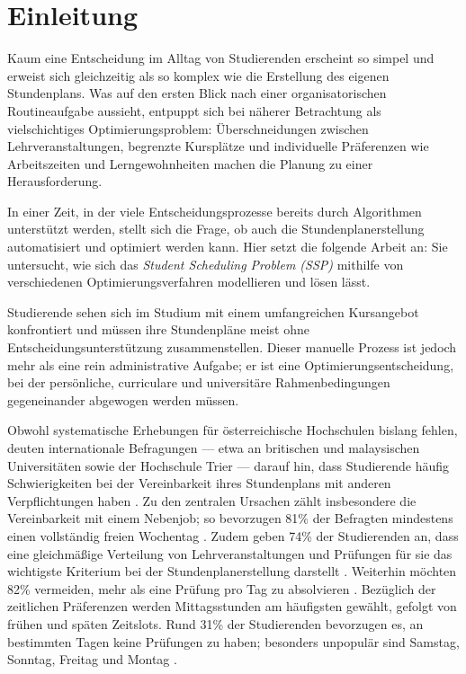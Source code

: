 \section{Einleitung}


Kaum eine Entscheidung im Alltag von Studierenden erscheint so simpel und erweist sich gleichzeitig als so komplex wie die Erstellung des eigenen Stundenplans. Was auf den ersten Blick nach einer organisatorischen Routineaufgabe aussieht, entpuppt sich bei näherer Betrachtung als vielschichtiges Optimierungsproblem: Überschneidungen zwischen Lehrveranstaltungen, begrenzte Kursplätze und individuelle Präferenzen wie Arbeitszeiten und Lerngewohnheiten machen die Planung zu einer Herausforderung.

In einer Zeit, in der viele Entscheidungsprozesse bereits durch Algorithmen unterstützt werden, stellt sich die Frage, ob auch die Stundenplanerstellung automatisiert und optimiert werden kann. Hier setzt die folgende Arbeit an: Sie untersucht, wie sich das \textit{Student Scheduling Problem (SSP)} mithilfe von verschiedenen Optimierungsverfahren modellieren und lösen lässt.




Studierende sehen sich im Studium mit einem umfangreichen Kursangebot konfrontiert und müssen ihre Stundenpläne meist ohne Entscheidungsunterstützung zusammenstellen. Dieser manuelle Prozess ist jedoch mehr als eine rein administrative Aufgabe; er ist eine Optimierungsentscheidung, bei der persönliche, curriculare und universitäre Rahmenbedingungen gegeneinander abgewogen werden müssen.

Obwohl systematische Erhebungen für österreichische Hochschulen bislang fehlen, deuten internationale Befragungen --- etwa an britischen und malaysischen Universitäten sowie der Hochschule Trier --- darauf hin, dass Studierende häufig Schwierigkeiten bei der Vereinbarkeit ihres Stundenplans mit anderen Verpflichtungen haben \cite{chen-2021, muklason-2017, trier-2024}. Zu den zentralen Ursachen zählt insbesondere die Vereinbarkeit mit einem Nebenjob; so bevorzugen 81\% der Befragten mindestens einen vollständig freien Wochentag \cite{trier-2024}. Zudem geben 74\% der Studierenden an, dass eine gleichmäßige Verteilung von Lehrveranstaltungen und Prüfungen für sie das wichtigste Kriterium bei der Stundenplanerstellung darstellt \cite{cowling-2002}. Weiterhin möchten 82\% vermeiden, mehr als eine Prüfung pro Tag zu absolvieren \cite{cowling-2002}.
Bezüglich der zeitlichen Präferenzen werden Mittagsstunden am häufigsten gewählt, gefolgt von frühen und späten Zeitslots. Rund 31\% der Studierenden bevorzugen es, an bestimmten Tagen keine Prüfungen zu haben; besonders unpopulär sind Samstag, Sonntag, Freitag und Montag \cite{cowling-2002}.

